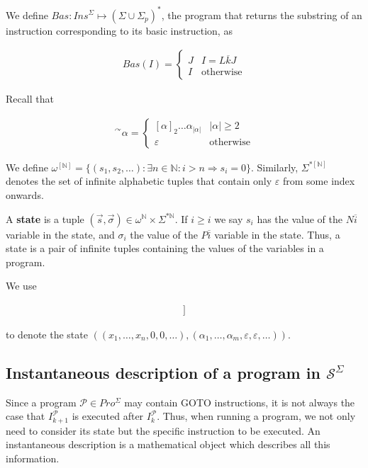 \documentclass[a4paper, 12pt]{article}
\begin{document}
We define $Bas : Ins^{\Sigma} \mapsto (\Sigma \cup \Sigma_p)^{*}$, the program
that returns the substring of an instruction corresponding to its basic
instruction, as 

\begin{align*}
    Bas(I) = \begin{cases}
        J & I = L \overline{k} J \\ 
        I & \text{otherwise}
    \end{cases}
\end{align*}

Recall that 

\begin{align*}
    {}^{\curvearrowright} \alpha = \begin{cases}
        [\alpha]_2 \ldots \alpha_|\alpha| & |\alpha| \geq 2 \\ 
        \varepsilon & \text{otherwise}
    \end{cases}
\end{align*}

We define $\omega^{[ \mathbb{N} ]} = \{ (s_1, s_2, \ldots) : \exists n \in
\mathbb{N} : i > n \Rightarrow s_i = 0 \}$. Similarly, $\Sigma^{*[ \mathbb{N} ]}$ denotes the set of infinite alphabetic
tuples that contain only $\varepsilon$ from some index onwards.

A \textbf{state} is a tuple $(\overrightarrow{s}, \overrightarrow{\sigma}) \in
\omega^{\mathbb{N}} \times \Sigma^{*\mathbb{N}}$. If $i \geq i$ we say $s_i$ has
the value of the ${N} \overline{i}$ variable in the state, and $\sigma_i$ the
value of the $P \overline{i}$ variable in the state. Thus, a state is a pair of
infinite tuples containing the values of the variables in a program.

We use 

\begin{align*}
    [\![ x_1, \ldots x_n, ~ \alpha_1, \ldots, \alpha_m ]\!]
\end{align*}

to denote the state $\left( (x_1, \ldots, x_n, 0, 0, \ldots), (\alpha_1, \ldots,
\alpha_m, \varepsilon, \varepsilon,\ldots) \right) $.

\subsection{Instantaneous description of a program in $\mathcal{S}^{\Sigma}$}

Since a program $\mathcal{P} \in Pro^{\Sigma}$ may contain GOTO instructions,
it is not always the case that $I_{k+1}^{\mathcal{P}}$ is executed after
$I_k^{\mathcal{P}}$. Thus, when running a program, we not only need to consider
its state but the specific instruction to be executed. An instantaneous
description is a mathematical object which describes all this information.
\end{document}
